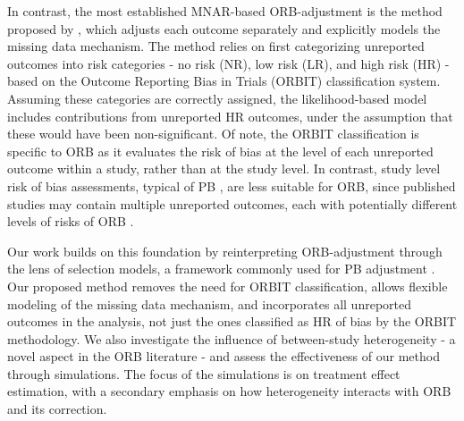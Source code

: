 \documentclass[twocolumn]{article}\usepackage[]{graphicx}\usepackage[]{xcolor}
\begin{document}
In contrast, the most established MNAR-based ORB-adjustment is the method proposed by \citet{Copas2019, Copas2014}, which adjusts each outcome separately and explicitly models the missing data mechanism. The method relies on first categorizing unreported outcomes into risk categories - no risk (NR), low risk (LR), and high risk (HR) - based on the Outcome Reporting Bias in Trials (ORBIT) classification system. Assuming these categories are correctly assigned, the likelihood-based model includes contributions from unreported HR outcomes, under the assumption that these would have been non-significant. Of note, the ORBIT classification is specific to ORB as it evaluates the risk of bias at the level of each unreported outcome within a study, rather than at the study level. In contrast, study level risk of bias assessments, typical of PB \citep{Lunny2024,RiskBias, Begg, Salanti}, are less suitable for ORB, since published studies may contain multiple unreported outcomes, each with potentially different levels of risks of ORB \citep{Copas2019, Copas2014, Kirkham2012}.

Our work builds on this foundation by reinterpreting ORB-adjustment through the lens of selection models, a framework commonly used for PB adjustment \citep{selection2, selection1, reviewselection}. Our proposed method removes the need for ORBIT classification, allows flexible modeling of the missing data mechanism, and incorporates all unreported outcomes in the analysis, not just the ones classified as HR of bias by the ORBIT methodology. We also investigate the influence of between-study heterogeneity - a novel aspect in the ORB literature - and assess the effectiveness of our method through simulations. The focus of the simulations is on treatment effect estimation, with a secondary emphasis on how heterogeneity interacts with ORB and its correction. 

\end{document}
